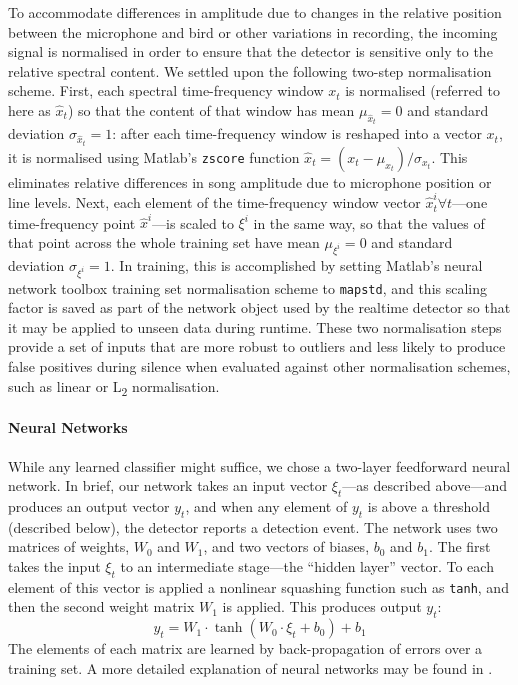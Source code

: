 \documentclass[10pt,letterpaper]{article}
\renewcommand{\subsubsection}[1]{\paragraph{#1}}
\begin{document}
To accommodate differences in amplitude due to changes in the relative position between the microphone and bird or other
variations in recording, the incoming signal is normalised in order to ensure that the 
detector is sensitive only to the relative spectral content.  We settled upon the following two-step normalisation scheme. First, each spectral time-frequency window $x_t$ is normalised (referred to here as $\hat{x}_t$) so that the content of that window has mean $\mu_{\hat{x}_t}=0$ and  standard deviation $\sigma_{\hat{x}_t}=1$: after each time-frequency window is reshaped into a vector $x_t$, it is normalised using Matlab's {\tt zscore} function $\hat{x}_t = (x_t - \mu_{x_t}) / \sigma_{x_t}$. This eliminates relative differences in song
amplitude due to microphone position or line levels. Next, each element of the time-frequency window vector $\hat{x}^i_t\forall t$---one time-frequency point $\hat{x}^{i}$---is scaled to $\xi^i$ in the same way, so that the values of that point across the whole training set have mean $\mu_{\xi^i}=0$ and standard deviation $\sigma_{\xi^i}=1$.  In training, this is accomplished by setting Matlab's neural network toolbox training set normalisation scheme to {\tt mapstd}, and this scaling factor is saved as part of the network object used by the realtime detector so that it may be applied to unseen data during runtime.
These two normalisation steps provide a set of inputs that are more
robust to outliers and less likely to produce false positives during 
silence when evaluated against other normalisation schemes, such as 
linear or L\textsubscript{2} normalisation.

\subsubsection{Neural Networks}

While any learned classifier might suffice, we chose a two-layer feedforward neural network.  In brief, our network takes an input vector $\xi_t$---as described above---and produces an output vector $y_t$, and when any element of $y_t$ is above a threshold (described below), the detector reports a detection event.  The network uses two matrices of weights, $W_0$ and $W_1$, and two vectors of biases, $b_0$ and $b_1$.  The first takes the input $\xi_t$ to an intermediate stage---the ``hidden layer'' vector.  To each element of this vector is applied a nonlinear squashing function such as {\tt tanh}, and then the second weight matrix $W_1$ is applied.  This produces output $y_t$:
\begin{equation*}
  y_t = W_1 \cdot \tanh (W_0 \cdot \xi_t + b_0) + b_1
\end{equation*}
The elements of each matrix are learned by back-propagation of errors over a training set.  A more detailed explanation of neural networks may be found in \cite{hkp}.
\end{document}
